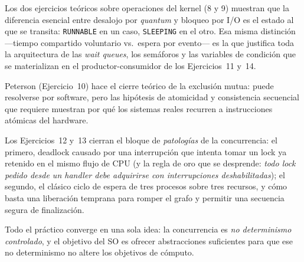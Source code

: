 \documentclass[11pt,a4paper]{article}
\begin{document}
Los dos ejercicios teóricos sobre operaciones del kernel (8 y 9)
muestran que la diferencia esencial entre desalojo por \emph{quantum}
y bloqueo por I/O es el estado al que se transita: \texttt{RUNNABLE}
en un caso, \texttt{SLEEPING} en el otro. Esa misma distinción
---tiempo compartido voluntario vs.\ espera por evento--- es la que
justifica toda la arquitectura de las \emph{wait queues}, los
semáforos y las variables de condición que se materializan en el
productor-consumidor de los Ejercicios~11 y~14.

Peterson (Ejercicio~10) hace el cierre teórico de la exclusión mutua:
puede resolverse por software, pero las hipótesis de atomicidad y
consistencia secuencial que requiere muestran por qué los sistemas
reales recurren a instrucciones atómicas del hardware.

Los Ejercicios~12 y~13 cierran el bloque de \emph{patologías} de la
concurrencia: el primero, deadlock causado por una interrupción que
intenta tomar un lock ya retenido en el mismo flujo de CPU (y la regla
de oro que se desprende: \emph{todo lock pedido desde un handler debe
adquirirse con interrupciones deshabilitadas}); el segundo, el clásico
ciclo de espera de tres procesos sobre tres recursos, y cómo basta una
liberación temprana para romper el grafo y permitir una secuencia
segura de finalización.

Todo el práctico converge en una sola idea: la concurrencia es
\emph{no determinismo controlado}, y el objetivo del SO es ofrecer
abstracciones suficientes para que ese no determinismo no altere los
objetivos de cómputo.
\end{document}
